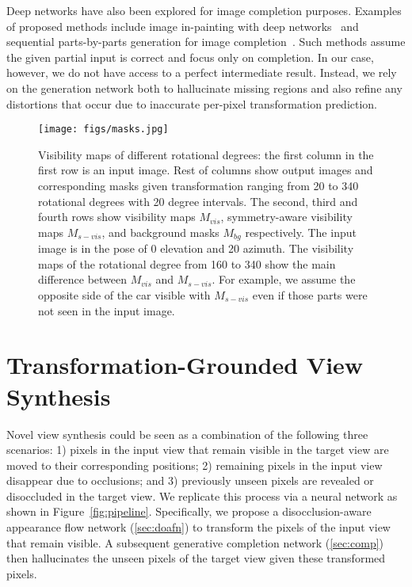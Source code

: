 \documentclass[10pt,twocolumn,letterpaper]{article}
\begin{document}
Deep networks have also been explored for image completion purposes. Examples of proposed methods include image in-painting with deep networks~\cite{pathak_cvpr2016} and sequential parts-by-parts generation for image completion~\cite{kwak_arxiv2016}. Such methods assume the given partial input is correct and focus only on completion. In our case, however, we do not have access to a perfect intermediate result. Instead, we rely on the generation network both to hallucinate missing regions and also refine any distortions that occur due to inaccurate per-pixel transformation prediction.

\begin{figure*}[t]
\begin{center}
\texttt{[image: figs/masks.jpg]}
\end{center}
\caption{Visibility maps of different rotational degrees: the first column in the first row is an input image. Rest of columns show output images and corresponding masks given transformation ranging from 20 to 340 rotational degrees with 20 degree intervals. The second, third and fourth rows show visibility maps $M_{vis}$, symmetry-aware visibility maps $M_{s-vis}$, and background masks $M_{bg}$ respectively. The input image is in the pose of 0 elevation and 20 azimuth. The visibility maps of the rotational degree from 160 to 340 show the main difference between $M_{vis}$ and $M_{s-vis}$. For example, we assume the opposite side of the car visible with $M_{s-vis}$ even if those parts were not seen in the input image.}
\label{fig:masks}
\vspace{-2mm}
\end{figure*}

\section{Transformation-Grounded View Synthesis}
%
Novel view synthesis could be seen as a combination of the following three scenarios: 1) pixels in the input view that remain visible in the target view are moved to their corresponding positions; 2) remaining pixels in the input view disappear due to occlusions; and 3) previously unseen pixels are revealed or disoccluded in the target view. We replicate this process via a neural network as shown in Figure~\ref{fig:pipeline}. Specifically, we propose a disocclusion-aware appearance flow network (\ref{sec:doafn}) to transform the pixels of the input view that remain visible. A subsequent generative completion network (\ref{sec:comp}) then hallucinates the unseen pixels of the target view given these transformed pixels.
%
\end{document}
